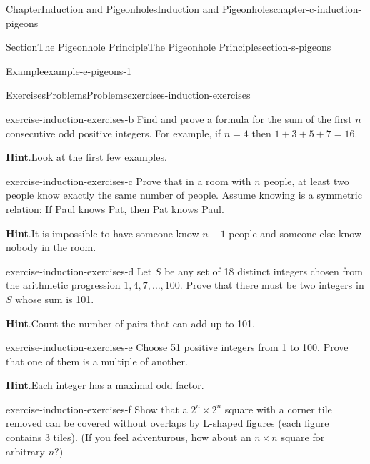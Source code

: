 \documentclass[oneside,10pt,]{book}
\newcommand{\blocktitlefont}{\relax}
\numberwithin{equation}{section}
\begin{document}
\begin{chapterptx}{Chapter}{Induction and Pigeonholes}{}{Induction and Pigeonholes}{}{}{chapter-c-induction-pigeons}
\begin{sectionptx}{Section}{The Pigeonhole Principle}{}{The Pigeonhole Principle}{}{}{section-s-pigeons}
\begin{example}{Example}{}{example-e-pigeons-1}
\end{example}
\end{sectionptx}
%
%
\typeout{************************************************}
\typeout{************************************************}
%
\begin{exercises-section}{Exercises}{Problems}{}{Problems}{}{}{exercises-induction-exercises}
\begin{divisionexercise}{1}{}{}{exercise-induction-exercises-b}%
Find and prove a formula for the sum of the first \(n\) consecutive odd positive integers. For example, if \(n = 4\) then \(1 + 3 + 5 + 7 = 16\).%
\par\smallskip%
\noindent\textbf{\blocktitlefont Hint}.\hypertarget{hint-induction-exercises-b-b}{}\quad{}Look at the first few examples.%
\end{divisionexercise}%
\begin{divisionexercise}{2}{}{}{exercise-induction-exercises-c}%
Prove that in a room with \(n\) people, at least two people know exactly the same number of people. Assume knowing is a symmetric relation: If Paul knows Pat, then Pat knows Paul.%
\par\smallskip%
\noindent\textbf{\blocktitlefont Hint}.\hypertarget{hint-induction-exercises-c-b}{}\quad{}It is impossible to have someone know \(n-1\) people and someone else know nobody in the room.%
\end{divisionexercise}%
\begin{divisionexercise}{3}{}{}{exercise-induction-exercises-d}%
Let \(S\) be any set of 18 distinct integers chosen from the arithmetic progression \(1, 4, 7, \dots , 100\). Prove that there must be two integers in \(S\) whose sum is 101.%
\par\smallskip%
\noindent\textbf{\blocktitlefont Hint}.\hypertarget{hint-induction-exercises-d-b}{}\quad{}Count the number of pairs that can add up to 101.%
\end{divisionexercise}%
\begin{divisionexercise}{4}{}{}{exercise-induction-exercises-e}%
Choose 51 positive integers from 1 to 100. Prove that one of them is a multiple of another.%
\par\smallskip%
\noindent\textbf{\blocktitlefont Hint}.\hypertarget{hint-induction-exercises-e-b}{}\quad{}Each integer has a maximal odd factor.%
\end{divisionexercise}%
\begin{divisionexercise}{5}{}{}{exercise-induction-exercises-f}%
Show that a \(2^n \times  2^n\) square with a corner tile removed can be covered without overlaps by L-shaped figures (each figure contains 3 tiles). (If you feel adventurous, how about an \(n \times  n\) square for arbitrary \(n\)?)%

\end{divisionexercise}
\end{exercises-section}
\end{chapterptx}
\end{document}
